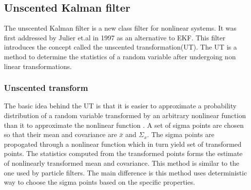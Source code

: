 \subsection{Unscented Kalman filter}
The unscented Kalman filter is a new class filter for nonlinear systems. It was first addressed by Julier et.al in 1997 \citep{jul97} as an alternative to EKF. This filter introduces the concept called the unscented transformation(UT). The UT is a method to determine the statistics of a random variable after undergoing non linear transformations.

\subsubsection{Unscented transform}
The basic idea behind the UT is that it is easier to approximate a probability distribution of a random variable transformed by an arbitrary nonlinear function than it to approximate the nonlinear function \citep{jul04}. A set of sigma points are chosen so that their mean and covariance are $\bar x$ and $\Sigma_x$. The sigma points are propogated through a nonlinear function which in turn yield set of transformed points. The statistics computed from the transformed points forms the estimate of nonlinearly transformed mean and covariance. This method is similar to the one used by particle filters. The main difference is this method uses deterministic way to choose the sigma points based on the specific properties.


